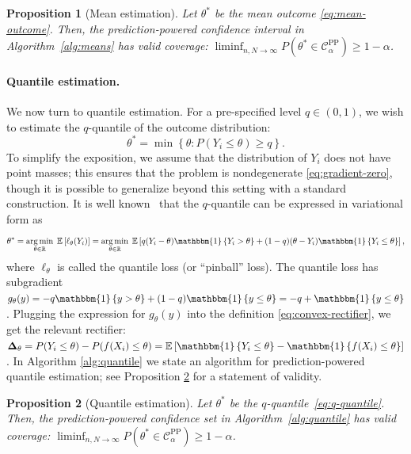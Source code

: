 \documentclass[10pt]{article}
\newtheorem{prop}{Proposition}
\def\R{\mathbb{R}}
\def\E{\mathbb{E}}
\newcommand{\ind}[1]{\mathbbm{1}\left\{#1\right\}}
\newcommand{\rec}{\mathbf{\Delta}}
\newcommand{\CPP}{\mathcal{C}^{\mathrm{PP}}}
\DeclareMathOperator*{\argmin}{arg\,min}
\begin{document}
\begin{prop}[Mean estimation]
\label{prop:mean_est_validity} 
Let $\theta^*$ be the mean outcome \eqref{eq:mean-outcome}. Then, the prediction-powered confidence interval in Algorithm~\ref{alg:means} has valid coverage: $\liminf_{n,N\rightarrow\infty}P\left(\theta^* \in  \CPP_\alpha\right) \ge 1-\alpha$.
\end{prop}

\paragraph{Quantile estimation.}
We now turn to quantile estimation.
For a pre-specified level $q\in(0,1)$, we wish to estimate the $q$-quantile of the outcome distribution:
\begin{equation}
\label{eq:q-quantile}
\theta^* = \min\left\{\theta: P\left( Y_i \leq \theta\right) \geq q\right\}.
\end{equation}
To simplify the exposition, we assume that the distribution of $Y_i$ does not have point masses; this ensures that the problem is nondegenerate \eqref{eq:gradient-zero}, though it is  possible to generalize beyond this setting with a standard construction.
It is well known~\cite{koenker1978regression} that the $q$-quantile can be expressed in variational form as
\begin{equation}
    \label{eq:quantile-def}
    \theta^* = \argmin_{\theta\in\R} \; \E\left[\ell_{\theta}(Y_i)\right] = \argmin_{\theta\in\R} \; \E\left[q(Y_i-\theta)\ind{Y_i > \theta} + (1-q)(\theta-Y_i)\ind{Y_i \leq \theta}\right],
\end{equation}
where $\ell_{\theta}$ is called the quantile loss (or ``pinball'' loss). The quantile loss has subgradient $g_{\theta}(y) = -q\ind{y > \theta} + (1-q)\ind{y \leq \theta} = -q + \ind{y \leq \theta}$.
Plugging the expression for $g_{\theta}(y)$ into the definition \eqref{eq:convex-rectifier}, we get the relevant rectifier: $\rec_{\theta} = P(Y_i\leq \theta) - P(f(X_i)\leq \theta) = \E \left[\ind{Y_i\leq \theta} - \ind{f(X_i)\leq \theta}\right]$. In Algorithm \ref{alg:quantile} we state an algorithm for prediction-powered quantile estimation; see Proposition \ref{prop:quantile} for a statement of validity.


\begin{prop}[Quantile estimation]
\label{prop:quantile}
    Let $\theta^*$ be the $q$-quantile~\eqref{eq:q-quantile}. Then, the prediction-powered confidence set in Algorithm~\ref{alg:quantile} has valid coverage: $\liminf_{n,N\rightarrow\infty} P\left(\theta^* \in \CPP_{\alpha}\right) \geq 1-\alpha$.
\end{prop}
\end{document}
